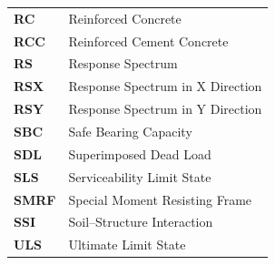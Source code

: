 \begin{titlepage}
{\begin{tabular}{@{}p{2.8cm}p{11.0cm}@{}}
        \textbf{RC}    & Reinforced Concrete \\[0.5ex]
        \textbf{RCC}   & Reinforced Cement Concrete \\[0.5ex]
        \textbf{RS}    & Response Spectrum \\[0.5ex]
        \textbf{RSX}   & Response Spectrum in X Direction \\[0.5ex]
        \textbf{RSY}   & Response Spectrum in Y Direction \\[0.5ex]
        \textbf{SBC}   & Safe Bearing Capacity \\[0.5ex]
        \textbf{SDL}   & Superimposed Dead Load \\[0.5ex]
        \textbf{SLS}   & Serviceability Limit State \\[0.5ex]
        \textbf{SMRF}  & Special Moment Resisting Frame \\[0.5ex]
        \textbf{SSI}   & Soil--Structure Interaction \\[0.5ex]
        \textbf{ULS}   & Ultimate Limit State \\[0.5ex]
    \end{tabular}
    }

\end{titlepage}